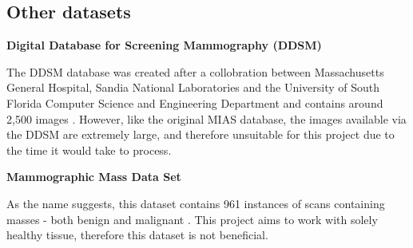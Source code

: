 \subsection{Other datasets}

\noindent \textbf{Digital Database for Screening Mammography (DDSM)}

The \acrshort{DDSM} database was created after a collobration between Massachusetts General Hospital, Sandia National Laboratories and the University of South Florida Computer Science and Engineering Department and contains around 2,500 images \cite{Heath_Bowyer_Kopans_Moore_Kegelmeyer_Processing} \cite{Heath_Bowyer_Kopans_Kegelmeyer_Moore_Chang_MunishKumaran_1998}.
However, like the original \acrshort{MIAS} database, the images available via the DDSM are extremely large, and therefore unsuitable for this project due to the time it would take to process.

\noindent \textbf{Mammographic Mass Data Set}

As the name suggests, this dataset contains 961 instances of scans containing masses - both benign and malignant \cite{Elter_Schulz-Wendtland_Wittenberg_2007}. This project aims to work with solely healthy tissue, therefore this dataset is not beneficial.
